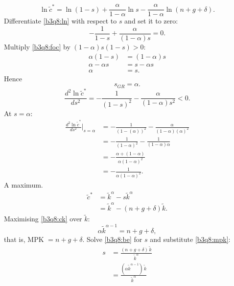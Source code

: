 \begin{sol}
\begin{equation}
\ln\tilde c^*=\ln(1-s)+\frac{\alpha}{1-\alpha}\ln s-\frac{\alpha}{1-\alpha}\ln(n+g+\delta). \label{b3q8:ln}
\end{equation}
Differentiate \eqref{b3q8:ln} with respect to $s$ and set it to zero:
\begin{equation}
-\frac1{1-s}+\frac{\alpha}{(1-\alpha)s}=0. \label{b3q8:foc}
\end{equation}
Multiply \eqref{b3q8:foc} by $(1-\alpha)s(1-s)>0$:
\begin{align*}
\alpha(1-s)&=(1-\alpha)s\\
\alpha-\alpha s&=s-\alpha s\\
\alpha&=s .
\end{align*}
Hence
\begin{equation}
\boxed{s_{GR}=\alpha}. \label{b3q8:sgr}
\end{equation}
\[
\frac{d^2\ln\tilde c^*}{ds^2}=-\frac1{(1-s)^2}-\frac{\alpha}{(1-\alpha)s^2}<0 .
\]
At $s=\alpha$:
\begin{align*}
\frac{d^2\ln\tilde c^*}{ds^2}\Big|_{s=\alpha}&=-\frac1{(1-(\alpha))^2}-\frac{\alpha}{(1-\alpha)(\alpha)^2}\\
&=-\frac1{(1-\alpha)^2}-\frac{1}{(1-\alpha)\alpha}\\
&=-\frac{\alpha+(1-\alpha)}{\alpha(1-\alpha)^2}\\
&=-\frac1{\alpha(1-\alpha)^2}.
\end{align*}
A maximum.
\begin{align}
\tilde c^*&=\tilde k^{\alpha}-s\tilde k^{\alpha}\nonumber\\
&=\tilde k^{\alpha}-(n+g+\delta)\tilde k. \label{b3q8:ck}
\end{align}
Maximising \eqref{b3q8:ck} over $\tilde k$:
\begin{equation}
\alpha\tilde k^{\alpha-1}=n+g+\delta, \label{b3q8:mpk}
\end{equation}
that is, MPK $=n+g+\delta$. Solve \eqref{b3q8:be} for $s$ and substitute \eqref{b3q8:mpk}:
\begin{align*}
s&=\frac{(n+g+\delta)\,\tilde k}{\tilde k^{\alpha}}\\
&=\frac{(\alpha\tilde k^{\alpha-1})\,\tilde k}{\tilde k^{\alpha}}\\

\end{align*}
\end{sol}

